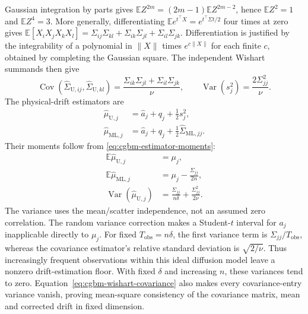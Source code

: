 \documentclass[11pt]{article}
\begin{document}
Gaussian integration by parts gives
$\mathbb E Z^{2m}=(2m-1)\mathbb E Z^{2m-2}$, hence
$\mathbb E Z^2=1$ and $\mathbb E Z^4=3$. More generally, differentiating
$\mathbb E e^{t^\top X}=e^{t^\top\Sigma t/2}$ four times at zero gives
$\mathbb E[X_iX_jX_kX_l]=\Sigma_{ij}\Sigma_{kl}+
\Sigma_{ik}\Sigma_{jl}+\Sigma_{il}\Sigma_{jk}$.
Differentiation is justified by the integrability of a polynomial
in $\|X\|$ times $e^{c\|X\|}$ for each finite $c$, obtained by
completing the Gaussian square. The independent Wishart summands then give
\begin{equation}
 \operatorname{Cov}(\widehat\Sigma_{\mathrm U,ij},
 \widehat\Sigma_{\mathrm U,kl})=
 \frac{\Sigma_{ik}\Sigma_{jl}+\Sigma_{il}\Sigma_{jk}}{\nu},
 \qquad \operatorname{Var}(s_j^2)=\frac{2\Sigma_{jj}^2}{\nu}.
 \label{eq:cgbm-wishart-covariance}
\end{equation}
The physical-drift estimators are
\begin{align}
 \widehat\mu_{\mathrm U,j}&=\widehat a_j+q_j+\tfrac12s_j^2,\\
 \widehat\mu_{\mathrm{ML},j}&=\widehat a_j+q_j+
 \tfrac12\widehat\Sigma_{\mathrm{ML},jj}.
 \label{eq:cgbm-physical-drift-estimators}
\end{align}
Their moments follow from \eqref{eq:cgbm-estimator-moments}:
\begin{align}
 \mathbb E\widehat\mu_{\mathrm U,j}&=\mu_j,\\
 \mathbb E\widehat\mu_{\mathrm{ML},j}&=\mu_j-\frac{\Sigma_{jj}}{2n},\\
 \operatorname{Var}(\widehat\mu_{\mathrm U,j})&=
 \frac{\Sigma_{jj}}{n\delta}+\frac{\Sigma_{jj}^2}{2\nu}.
 \label{eq:cgbm-physical-drift-moments}
\end{align}
The variance uses the mean/scatter independence, not an assumed
zero correlation. The random variance correction makes a Student-$t$
interval for $a_j$ inapplicable directly to $\mu_j$.
For fixed $T_{\mathrm{obs}}=n\delta$, the first variance term is
$\Sigma_{jj}/T_{\mathrm{obs}}$, whereas the covariance estimator's
relative standard deviation is $\sqrt{2/\nu}$. Thus increasingly
frequent observations within this ideal diffusion model leave a
nonzero drift-estimation floor. With fixed $\delta$ and increasing
$n$, these variances tend to zero. Equation~\eqref{eq:cgbm-wishart-covariance}
also makes every covariance-entry variance vanish, proving
mean-square consistency of the covariance matrix, mean and corrected drift
in fixed dimension.
\end{document}
